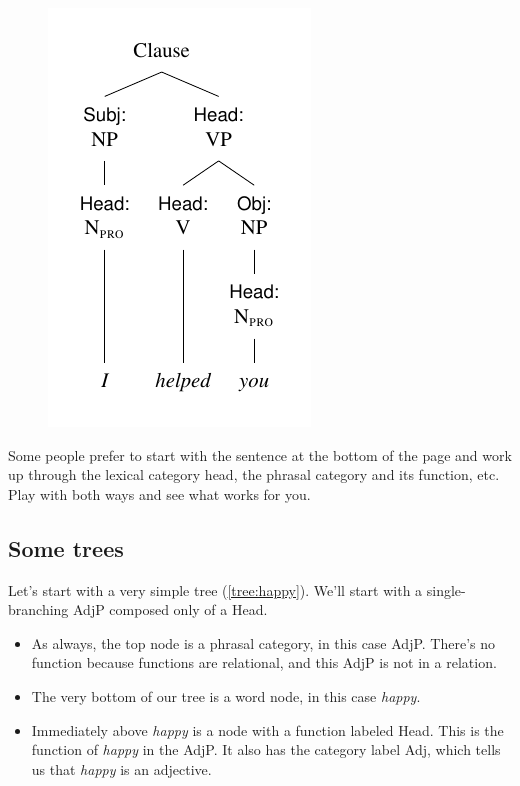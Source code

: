 \begin{figure}[H]
    \centering
    \includegraphics{figures/ihadmybreakfast6.pdf}
    \label{fig:breakfast6}
\end{figure}

Some people prefer to start with the sentence at the bottom of the page and work up through the lexical category head, the phrasal category and its function, etc. Play with both ways and see what works for you.





\subsection{Some trees}

Let's start with a very simple tree (\ref{tree:happy}). We'll start with a single-branching AdjP composed only of a Head.
\begin{itemize}[noitemsep]
    \item As always, the top node is a phrasal category, in this case AdjP. There's no function because functions are relational, and this AdjP is not in a relation.
    \item The very bottom of our tree is a word node, in this case \textit{happy}.
    \item Immediately above \textit{happy} is a node with a function labeled Head. This is the function of \textit{happy} in the AdjP. It also has the category label Adj, which tells us that \textit{happy} is an adjective.
\end{itemize}

